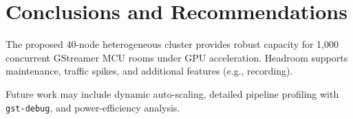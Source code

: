 \documentclass{article}
\begin{document}
\section{Conclusions and Recommendations}
The proposed 40-node heterogeneous cluster provides robust capacity for 1,000 concurrent GStreamer MCU rooms under GPU acceleration. Headroom supports maintenance, traffic spikes, and additional features (e.g., recording). 

Future work may include dynamic auto-scaling, detailed pipeline profiling with \texttt{gst-debug}, and power-efficiency analysis.
\end{document}

